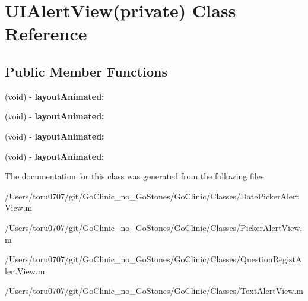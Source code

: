 \hypertarget{interface_u_i_alert_view_07private_08}{
\section{UIAlertView(private) Class Reference}
\label{interface_u_i_alert_view_07private_08}
}
\subsection*{Public Member Functions}
\begin{DoxyCompactItemize}
\item 
\hypertarget{interface_u_i_alert_view_07private_08_a216cdbd8054188d80df891e862b8e0a7}{
(void) -\/ {\bfseries layoutAnimated:}}
\label{interface_u_i_alert_view_07private_08_a216cdbd8054188d80df891e862b8e0a7}

\item 
\hypertarget{interface_u_i_alert_view_07private_08_a216cdbd8054188d80df891e862b8e0a7}{
(void) -\/ {\bfseries layoutAnimated:}}
\label{interface_u_i_alert_view_07private_08_a216cdbd8054188d80df891e862b8e0a7}

\item 
\hypertarget{interface_u_i_alert_view_07private_08_a216cdbd8054188d80df891e862b8e0a7}{
(void) -\/ {\bfseries layoutAnimated:}}
\label{interface_u_i_alert_view_07private_08_a216cdbd8054188d80df891e862b8e0a7}

\item 
\hypertarget{interface_u_i_alert_view_07private_08_a216cdbd8054188d80df891e862b8e0a7}{
(void) -\/ {\bfseries layoutAnimated:}}
\label{interface_u_i_alert_view_07private_08_a216cdbd8054188d80df891e862b8e0a7}

\end{DoxyCompactItemize}


The documentation for this class was generated from the following files:\begin{DoxyCompactItemize}
\item 
/Users/toru0707/git/GoClinic\_\-no\_\-GoStones/GoClinic/Classes/DatePickerAlertView.m\item 
/Users/toru0707/git/GoClinic\_\-no\_\-GoStones/GoClinic/Classes/PickerAlertView.m\item 
/Users/toru0707/git/GoClinic\_\-no\_\-GoStones/GoClinic/Classes/QuestionRegistAlertView.m\item 
/Users/toru0707/git/GoClinic\_\-no\_\-GoStones/GoClinic/Classes/TextAlertView.m\end{DoxyCompactItemize}
